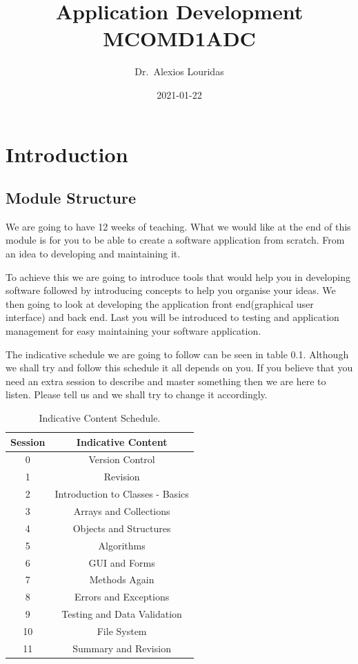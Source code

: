 \documentclass[
]{book}
\title{Application Development MCOMD1ADC}
\author{Dr.~Alexios Louridas}
\date{2021-01-22}
\begin{document}
\maketitle

{
\setcounter{tocdepth}{1}
\tableofcontents
}
\hypertarget{introduction}{%
\chapter*{Introduction}\label{introduction}}

\hypertarget{module-structure}{%
\section*{Module Structure}\label{module-structure}}

We are going to have 12 weeks of teaching. What we would like at the end of this module is for you to be able to create a software application from scratch. From an idea to developing and maintaining it.

To achieve this we are going to introduce tools that would help you in developing software followed by introducing concepts to help you organise your ideas. We then going to look at developing the application front end(graphical user interface) and back end. Last you will be introduced to testing and application management for easy maintaining your software application.

The indicative schedule we are going to follow can be seen in table 0.1. Although we shall try and follow this schedule it all depends on you. If you believe that you need an extra session to describe and master something then we are here to listen. Please tell us and we shall try to change it accordingly.

\begin{table}

\caption{\label{tab:unnamed-chunk-1}Indicative Content Schedule.}
\centering
\begin{tabular}[t]{c|c}
\hline
Session & Indicative Content\\
\hline
0 & Version Control\\
\hline
1 & Revision\\
\hline
2 & Introduction to Classes - Basics\\
\hline
3 & Arrays and Collections\\
\hline
4 & Objects and Structures\\
\hline
5 & Algorithms\\
\hline
6 & GUI and Forms\\
\hline
7 & Methods Again\\
\hline
8 & Errors and Exceptions\\
\hline
9 & Testing and Data Validation\\
\hline
10 & File System\\
\hline
11 & Summary and Revision\\
\hline
\end{tabular}
\end{table}
\end{document}
